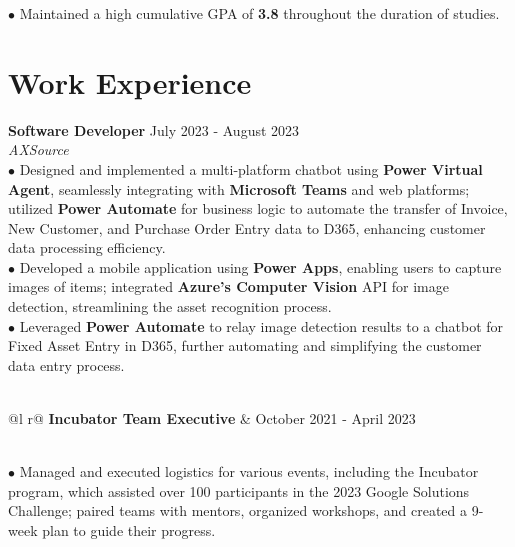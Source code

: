 \documentclass[letterpaper,12pt]{article}
\begin{document}
\hspace{0.3cm} $\bullet$ {\fontsize{10pt}{9pt}\selectfont Maintained a high cumulative GPA of \textbf{3.8} throughout the duration of studies.}

\section{Work Experience}

\textbf{Software Developer}  \hfill   July 2023 - August 2023 \\
\textit{AXSource} 
\vspace{0.3cm}  
\\\hspace{0.1cm} $\bullet$ \hspace{0.05cm}Designed and implemented a multi-platform chatbot using \textbf{Power Virtual Agent}, seamlessly integrating with \textbf{Microsoft Teams} and web platforms; utilized \textbf{Power Automate} for business logic to automate the transfer of Invoice, New Customer, and Purchase Order Entry data to D365, enhancing customer data processing efficiency.\\
\hspace{0.1cm} $\bullet$ \hspace{0.001cm}Developed a mobile application using \textbf{Power Apps}, enabling users to capture images of items; integrated \textbf{Azure's Computer Vision} API for image detection, streamlining the asset recognition process. \\
\hspace{0.1cm} $\bullet$  \hspace{0.05cm}Leveraged \textbf{Power Automate} to relay image detection results to a chatbot for Fixed Asset Entry in D365, further automating and simplifying the customer data entry process. \\\\
\begin{tabularx}{\linewidth}{ @{}l r@{} }
    \textbf{Incubator Team Executive} &  \hfill \normalsize{October 2021 - April 2023} \\
\end{tabularx} 
\vspace{0.25cm} \\
\hspace{0.1cm} $\bullet$ Managed and executed logistics for various events, including the Incubator program, which assisted over 100 participants in the 2023 Google Solutions Challenge; paired teams with mentors, organized workshops, and created a 9-week plan to guide their progress. \\ 
\end{document}

